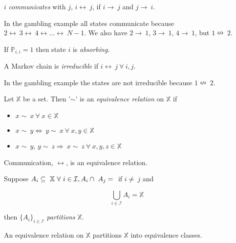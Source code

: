 \begin{definition}
$i$ \textit{communicates} with $j$, $i\leftrightarrow~j$, if $i\rightarrow~j$ and $j\rightarrow~i$.
\end{definition}
In the gambling example all states communicate because $2\leftrightarrow~3\leftrightarrow~4\leftrightarrow\ldots\leftrightarrow~N-1$.
We also have $2\rightarrow~1$, $3\rightarrow~1$, $4\rightarrow~1$, but $1\nleftrightarrow~2$.

\begin{definition}
\label{def:absorbing}
If $\mathbb{P}_{i,i}=1$ then state $i$ is \textit{absorbing}.
\end{definition}

\begin{definition}
A Markov chain is \textit{irreducible} if $i\leftrightarrow~j~\forall~i,j$.
\end{definition}
In the gambling example the states are not irreducible because $1\nleftrightarrow~2$.

\begin{definition}
Let $\mathbb{X}$ be a set.
Then '$\sim$' is an \textit{equivalence relation} on $\mathbb{X}$ if
\begin{itemize}
\item $x\sim~x~\forall~x\in\mathbb{X}$
\item $x\sim~y \Leftrightarrow~y\sim~x~\forall~x,y\in\mathbb{X}$
\item $x\sim~y$, $y\sim~z \Rightarrow~x\sim~z~\forall~x,y,z\in\mathbb{X}$
\end{itemize}
\end{definition}

\begin{theorem}
Communication, $\leftrightarrow$, is an equivalence relation.
\end{theorem}

\begin{definition}
Suppose $A_i\subseteq~\mathbb{X}~\forall~i\in\mathcal{I}, A_i\cap~A_j=\null$ if $i\neq~j$ and

\begin{equation*}
\bigcup_{i\in\mathcal{I}}A_i = \mathbb{X}
\end{equation*}

then $\{A_i\}_{i\in\mathcal{I}}$ \textit{partitions} $\mathbb{X}$.%
\end{definition}

\begin{theorem}
An equivalence relation on $\mathbb{X}$ partitions $\mathbb{X}$ into equivalence classes.
\end{theorem}

